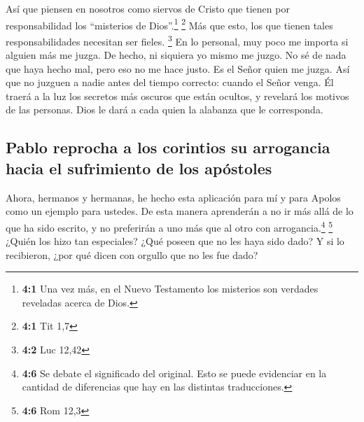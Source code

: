  Así que piensen en nosotros como siervos de Cristo que
tienen por responsabilidad los ``misterios de Dios''.\footnote{\textbf{4:1}
  Una vez más, en el Nuevo Testamento los misterios son verdades
  reveladas acerca de Dios.} \footnote{\textbf{4:1} Tit 1,7}
 Más que esto, los que tienen tales responsabilidades
necesitan ser fieles. \footnote{\textbf{4:2} Luc 12,42} 
En lo personal, muy poco me importa si alguien más me juzga. De hecho,
ni siquiera yo mismo me juzgo.  No sé de nada que haya
hecho mal, pero eso no me hace justo. Es el Señor quien me juzga.
 Así que no juzguen a nadie antes del tiempo correcto:
cuando el Señor venga. Él traerá a la luz los secretos más oscuros que
están ocultos, y revelará los motivos de las personas. Dios le dará a
cada quien la alabanza que le corresponda.

\hypertarget{pablo-reprocha-a-los-corintios-su-arrogancia-hacia-el-sufrimiento-de-los-apuxf3stoles}{%
\subsection{Pablo reprocha a los corintios su arrogancia hacia el
sufrimiento de los
apóstoles}\label{pablo-reprocha-a-los-corintios-su-arrogancia-hacia-el-sufrimiento-de-los-apuxf3stoles}}

 Ahora, hermanos y hermanas, he hecho esta aplicación para
mí y para Apolos como un ejemplo para ustedes. De esta manera aprenderán
a no ir más allá de lo que ha sido escrito, y no preferirán a uno más
que al otro con arrogancia.\footnote{\textbf{4:6} Se debate el
  significado del original. Esto se puede evidenciar en la cantidad de
  diferencias que hay en las distintas traducciones.} \footnote{\textbf{4:6}
  Rom 12,3}  ¿Quién los hizo tan especiales? ¿Qué poseen
que no les haya sido dado? Y si lo recibieron, ¿por qué dicen con
orgullo que no les fue dado?

